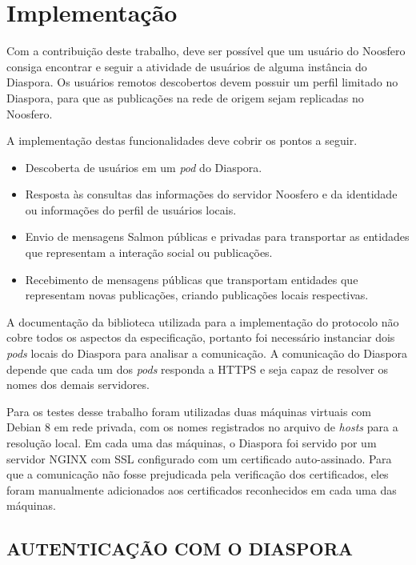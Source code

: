 \chapter{Implementação}
\label{chapter:4}

Com a contribuição deste trabalho, deve ser possível que um usuário do Noosfero
consiga encontrar e seguir a atividade de usuários de alguma instância do Diaspora.
Os usuários remotos descobertos devem possuir um perfil limitado no Diaspora, para
que as publicações na rede de origem sejam replicadas no Noosfero.

A implementação destas funcionalidades deve cobrir os pontos a seguir.

\begin{itemize}
  \item{Descoberta de usuários em um \textit{pod} do Diaspora.}
  \item{Resposta às consultas das informações do servidor Noosfero e da identidade
        ou informações do perfil de usuários locais.}
  \item{Envio de mensagens Salmon públicas e privadas para transportar as entidades
        que representam a interação social ou publicações.}
  \item{Recebimento de mensagens públicas que transportam entidades que representam
        novas publicações, criando publicações locais respectivas.}
\end{itemize}

A documentação da biblioteca utilizada para a implementação do protocolo não cobre
todos os aspectos da especificação, portanto foi necessário instanciar dois
\textit{pods} locais do Diaspora para analisar a comunicação. A comunicação do
Diaspora depende que cada um dos \textit{pods} responda a HTTPS e seja capaz de
resolver os nomes dos demais servidores.

Para os testes desse trabalho foram utilizadas duas máquinas virtuais com Debian 8
em rede privada, com os nomes registrados no arquivo de \textit{hosts} para a
resolução local. Em cada uma das máquinas, o Diaspora foi servido por um servidor
NGINX com SSL configurado com um certificado auto-assinado. Para que a comunicação
não fosse prejudicada pela verificação dos certificados, eles foram manualmente
adicionados aos certificados reconhecidos em cada uma das máquinas.

\section{AUTENTICAÇÃO COM O DIASPORA}

